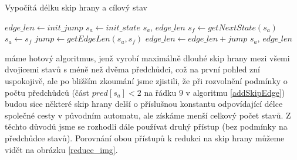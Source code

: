 \begin{algorithm}
    \caption{Vypočítá délku skip hrany a cílový stav}
    \label{addSkipEdge}
        \begin{algorithmic}[1]
                \State $edge\_len \gets init\_jump$
                \State $s_a \gets init\_state$
                        \State \Return $s_a$, $edge\_len$
                    \EndIf
                    \State $s_f \gets getNextState(s_a)$
                        \State $s_a \gets s_f$
                        \State $jump \gets getEdgeLen(s_a,s_f)$
                        \State $edge\_len \gets edge\_len + jump$
                    \Else
                        \State \Return $s_a$, $edge\_len$
                    \EndIf
                \EndWhile
            \EndProcedure
        \end{algorithmic}
\end{algorithm}

\noindent
máme hotový algoritmus, jenž vyrobí maximálně dlouhé skip hrany mezi všemi dvojicemi stavů s méně než dvěma předchůdci, což na první pohled zní uspokojivě, ale po bližším zkoumání jsme zjistili, že při rozvolnění podmínky o počtu předchůdců (část $pred[s_a]<2$ na řádku $9$ v algoritmu \ref{addSkipEdge}) budou sice některé skip hrany delší o příslušnou konstantu odpovídající délce společné cesty v původním automatu, ale získáme menší celkový počet stavů. Z těchto důvodů jsme se rozhodli dále používat druhý přístup (bez podmínky na předchůdce stavů). Porovnání obou přístupů k redukci na skip hrany můžeme vidět na obrázku \ref{reduce_img}.

